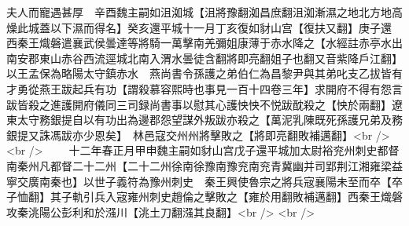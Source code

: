 夫人而寵遇甚厚　辛酉魏主嗣如沮洳城【沮將豫翻洳昌庶翻沮洳漸濕之地北方地高燥此城蓋以下濕而得名】癸亥還平城十一月丁亥復如豺山宫【復扶又翻】庚子還　西秦王熾磐遣襄武侯曇達等將騎一萬擊南羌彌姐康薄于赤水降之【水經註赤亭水出南安郡東山赤谷西流逕城北南入渭水曇徒含翻將即亮翻姐子也翻又音紫降戶江翻】以王孟保為略陽太守鎮赤水　燕尚書令孫護之弟伯仁為昌黎尹與其弟叱支乙拔皆有才勇從燕王跋起兵有功【謂殺慕容熙時也事見一百十四卷三年】求開府不得有怨言跋皆殺之進護開府儀同三司録尚書事以慰其心護怏怏不悦跋酖殺之【怏於兩翻】遼東太守務銀提自以有功出為邊郡怨望謀外叛跋亦殺之【萬泥乳陳既死孫護兄弟及務銀提又誅馮跋亦少恩矣】　林邑寇交州州將擊敗之【將即亮翻敗補邁翻】<br />
<br />
　　十二年春正月甲申魏主嗣如豺山宫戊子還平城加太尉裕兖州刺史都督南秦州凡都督二十二州【二十二州徐南徐豫南豫兖南兖青冀幽并司郢荆江湘雍梁益寧交廣南秦也】以世子義符為豫州刺史　秦王興使魯宗之將兵宼襄陽未至而卒【卒子恤翻】其子軌引兵入宼雍州刺史趙倫之擊敗之【雍於用翻敗補邁翻】西秦王熾磐攻秦洮陽公彭利和於漒川【洮土刀翻漒其良翻】<br />
<br />
